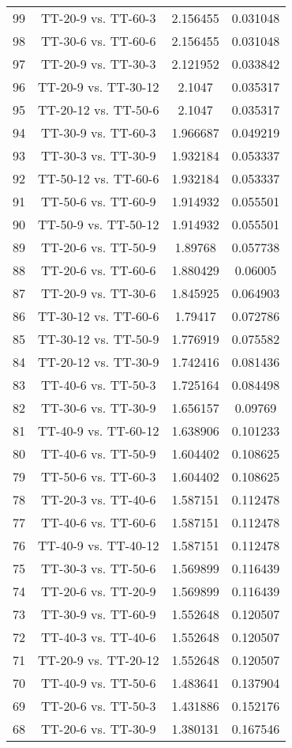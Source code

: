 \documentclass[a4paper,10pt]{article}
\begin{document}
\begin{landscape}
\begin{table}[!htp]
\begin{tabular}{cccc}
99&TT-20-9 vs. TT-60-3&2.156455&0.031048\\
98&TT-30-6 vs. TT-60-6&2.156455&0.031048\\
97&TT-20-9 vs. TT-30-3&2.121952&0.033842\\
96&TT-20-9 vs. TT-30-12&2.1047&0.035317\\
95&TT-20-12 vs. TT-50-6&2.1047&0.035317\\
94&TT-30-9 vs. TT-60-3&1.966687&0.049219\\
93&TT-30-3 vs. TT-30-9&1.932184&0.053337\\
92&TT-50-12 vs. TT-60-6&1.932184&0.053337\\
91&TT-50-6 vs. TT-60-9&1.914932&0.055501\\
90&TT-50-9 vs. TT-50-12&1.914932&0.055501\\
89&TT-20-6 vs. TT-50-9&1.89768&0.057738\\
88&TT-20-6 vs. TT-60-6&1.880429&0.06005\\
87&TT-20-9 vs. TT-30-6&1.845925&0.064903\\
86&TT-30-12 vs. TT-60-6&1.79417&0.072786\\
85&TT-30-12 vs. TT-50-9&1.776919&0.075582\\
84&TT-20-12 vs. TT-30-9&1.742416&0.081436\\
83&TT-40-6 vs. TT-50-3&1.725164&0.084498\\
82&TT-30-6 vs. TT-30-9&1.656157&0.09769\\
81&TT-40-9 vs. TT-60-12&1.638906&0.101233\\
80&TT-40-6 vs. TT-50-9&1.604402&0.108625\\
79&TT-50-6 vs. TT-60-3&1.604402&0.108625\\
78&TT-20-3 vs. TT-40-6&1.587151&0.112478\\
77&TT-40-6 vs. TT-60-6&1.587151&0.112478\\
76&TT-40-9 vs. TT-40-12&1.587151&0.112478\\
75&TT-30-3 vs. TT-50-6&1.569899&0.116439\\
74&TT-20-6 vs. TT-20-9&1.569899&0.116439\\
73&TT-30-9 vs. TT-60-9&1.552648&0.120507\\
72&TT-40-3 vs. TT-40-6&1.552648&0.120507\\
71&TT-20-9 vs. TT-20-12&1.552648&0.120507\\
70&TT-40-9 vs. TT-50-6&1.483641&0.137904\\
69&TT-20-6 vs. TT-50-3&1.431886&0.152176\\
68&TT-20-6 vs. TT-30-9&1.380131&0.167546\\

\end{tabular}
\end{table}
\end{landscape}
\end{document}
